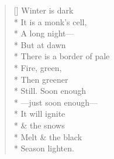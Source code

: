 \label{ch:equinox}
\settowidth{\versewidth}{There is a border of pale }
\begin{verse}[\versewidth]
Winter is dark\\*
It is a monk's cell,\\*
A long night---\\*
But at dawn \\*
There is a border of pale \\*
Fire, green, \\*
Then greener \\*
Still. Soon enough\\*
---just soon enough---\\*
It will ignite \\*
\& the snows \\*
Melt \& the black \\*
Season lighten.
\end{verse}
